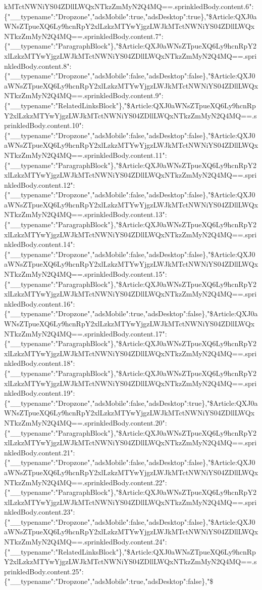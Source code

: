 kMTctNWNiYS04ZDllLWQxNTkzZmMyN2Q4MQ==.sprinkledBody.content.6":\{"\_\_typename":"Dropzone","adsMobile":true,"adsDesktop":true\},"\$Article:QXJ0aWNsZTpueXQ6Ly9hcnRpY2xlLzkzMTYwYjgzLWJkMTctNWNiYS04ZDllLWQxNTkzZmMyN2Q4MQ==.sprinkledBody.content.7":\{"\_\_typename":"ParagraphBlock"\},"\$Article:QXJ0aWNsZTpueXQ6Ly9hcnRpY2xlLzkzMTYwYjgzLWJkMTctNWNiYS04ZDllLWQxNTkzZmMyN2Q4MQ==.sprinkledBody.content.8":\{"\_\_typename":"Dropzone","adsMobile":false,"adsDesktop":false\},"\$Article:QXJ0aWNsZTpueXQ6Ly9hcnRpY2xlLzkzMTYwYjgzLWJkMTctNWNiYS04ZDllLWQxNTkzZmMyN2Q4MQ==.sprinkledBody.content.9":\{"\_\_typename":"RelatedLinksBlock"\},"\$Article:QXJ0aWNsZTpueXQ6Ly9hcnRpY2xlLzkzMTYwYjgzLWJkMTctNWNiYS04ZDllLWQxNTkzZmMyN2Q4MQ==.sprinkledBody.content.10":\{"\_\_typename":"Dropzone","adsMobile":false,"adsDesktop":false\},"\$Article:QXJ0aWNsZTpueXQ6Ly9hcnRpY2xlLzkzMTYwYjgzLWJkMTctNWNiYS04ZDllLWQxNTkzZmMyN2Q4MQ==.sprinkledBody.content.11":\{"\_\_typename":"ParagraphBlock"\},"\$Article:QXJ0aWNsZTpueXQ6Ly9hcnRpY2xlLzkzMTYwYjgzLWJkMTctNWNiYS04ZDllLWQxNTkzZmMyN2Q4MQ==.sprinkledBody.content.12":\{"\_\_typename":"Dropzone","adsMobile":false,"adsDesktop":false\},"\$Article:QXJ0aWNsZTpueXQ6Ly9hcnRpY2xlLzkzMTYwYjgzLWJkMTctNWNiYS04ZDllLWQxNTkzZmMyN2Q4MQ==.sprinkledBody.content.13":\{"\_\_typename":"ParagraphBlock"\},"\$Article:QXJ0aWNsZTpueXQ6Ly9hcnRpY2xlLzkzMTYwYjgzLWJkMTctNWNiYS04ZDllLWQxNTkzZmMyN2Q4MQ==.sprinkledBody.content.14":\{"\_\_typename":"Dropzone","adsMobile":false,"adsDesktop":false\},"\$Article:QXJ0aWNsZTpueXQ6Ly9hcnRpY2xlLzkzMTYwYjgzLWJkMTctNWNiYS04ZDllLWQxNTkzZmMyN2Q4MQ==.sprinkledBody.content.15":\{"\_\_typename":"ParagraphBlock"\},"\$Article:QXJ0aWNsZTpueXQ6Ly9hcnRpY2xlLzkzMTYwYjgzLWJkMTctNWNiYS04ZDllLWQxNTkzZmMyN2Q4MQ==.sprinkledBody.content.16":\{"\_\_typename":"Dropzone","adsMobile":true,"adsDesktop":false\},"\$Article:QXJ0aWNsZTpueXQ6Ly9hcnRpY2xlLzkzMTYwYjgzLWJkMTctNWNiYS04ZDllLWQxNTkzZmMyN2Q4MQ==.sprinkledBody.content.17":\{"\_\_typename":"ParagraphBlock"\},"\$Article:QXJ0aWNsZTpueXQ6Ly9hcnRpY2xlLzkzMTYwYjgzLWJkMTctNWNiYS04ZDllLWQxNTkzZmMyN2Q4MQ==.sprinkledBody.content.18":\{"\_\_typename":"ParagraphBlock"\},"\$Article:QXJ0aWNsZTpueXQ6Ly9hcnRpY2xlLzkzMTYwYjgzLWJkMTctNWNiYS04ZDllLWQxNTkzZmMyN2Q4MQ==.sprinkledBody.content.19":\{"\_\_typename":"Dropzone","adsMobile":false,"adsDesktop":true\},"\$Article:QXJ0aWNsZTpueXQ6Ly9hcnRpY2xlLzkzMTYwYjgzLWJkMTctNWNiYS04ZDllLWQxNTkzZmMyN2Q4MQ==.sprinkledBody.content.20":\{"\_\_typename":"ParagraphBlock"\},"\$Article:QXJ0aWNsZTpueXQ6Ly9hcnRpY2xlLzkzMTYwYjgzLWJkMTctNWNiYS04ZDllLWQxNTkzZmMyN2Q4MQ==.sprinkledBody.content.21":\{"\_\_typename":"Dropzone","adsMobile":false,"adsDesktop":false\},"\$Article:QXJ0aWNsZTpueXQ6Ly9hcnRpY2xlLzkzMTYwYjgzLWJkMTctNWNiYS04ZDllLWQxNTkzZmMyN2Q4MQ==.sprinkledBody.content.22":\{"\_\_typename":"ParagraphBlock"\},"\$Article:QXJ0aWNsZTpueXQ6Ly9hcnRpY2xlLzkzMTYwYjgzLWJkMTctNWNiYS04ZDllLWQxNTkzZmMyN2Q4MQ==.sprinkledBody.content.23":\{"\_\_typename":"Dropzone","adsMobile":false,"adsDesktop":false\},"\$Article:QXJ0aWNsZTpueXQ6Ly9hcnRpY2xlLzkzMTYwYjgzLWJkMTctNWNiYS04ZDllLWQxNTkzZmMyN2Q4MQ==.sprinkledBody.content.24":\{"\_\_typename":"RelatedLinksBlock"\},"\$Article:QXJ0aWNsZTpueXQ6Ly9hcnRpY2xlLzkzMTYwYjgzLWJkMTctNWNiYS04ZDllLWQxNTkzZmMyN2Q4MQ==.sprinkledBody.content.25":\{"\_\_typename":"Dropzone","adsMobile":true,"adsDesktop":false\},"\$